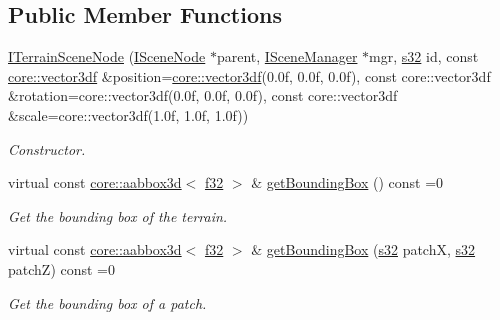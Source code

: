 \subsection*{Public Member Functions}
\begin{DoxyCompactItemize}
\item 
\mbox{\label{classirr_1_1scene_1_1ITerrainSceneNode_a152a472837bbce22d1221086a47d8af5}} 
\hyperlink{classirr_1_1scene_1_1ITerrainSceneNode_a152a472837bbce22d1221086a47d8af5}{I\+Terrain\+Scene\+Node} (\hyperlink{classirr_1_1scene_1_1ISceneNode}{I\+Scene\+Node} $\ast$parent, \hyperlink{classirr_1_1scene_1_1ISceneManager}{I\+Scene\+Manager} $\ast$mgr, \hyperlink{namespaceirr_ac66849b7a6ed16e30ebede579f9b47c6}{s32} id, const \hyperlink{namespaceirr_1_1core_ae6e2b2a6c552833ebbd5b7463d03586b}{core\+::vector3df} \&position=\hyperlink{namespaceirr_1_1core_ae6e2b2a6c552833ebbd5b7463d03586b}{core\+::vector3df}(0.\+0f, 0.\+0f, 0.\+0f), const core\+::vector3df \&rotation=core\+::vector3df(0.\+0f, 0.\+0f, 0.\+0f), const core\+::vector3df \&scale=core\+::vector3df(1.\+0f, 1.\+0f, 1.\+0f))
\begin{DoxyCompactList}\small\item\em Constructor. \end{DoxyCompactList}\item 
virtual const \hyperlink{classirr_1_1core_1_1aabbox3d}{core\+::aabbox3d}$<$ \hyperlink{namespaceirr_a0277be98d67dc26ff93b1a6a1d086b07}{f32} $>$ \& \hyperlink{classirr_1_1scene_1_1ITerrainSceneNode_a02a14fe28f5a326fca819c36bee2e92e}{get\+Bounding\+Box} () const =0
\begin{DoxyCompactList}\small\item\em Get the bounding box of the terrain. \end{DoxyCompactList}\item 
virtual const \hyperlink{classirr_1_1core_1_1aabbox3d}{core\+::aabbox3d}$<$ \hyperlink{namespaceirr_a0277be98d67dc26ff93b1a6a1d086b07}{f32} $>$ \& \hyperlink{classirr_1_1scene_1_1ITerrainSceneNode_a383501cc9c5cd30176f1f7ff6f8ab817}{get\+Bounding\+Box} (\hyperlink{namespaceirr_ac66849b7a6ed16e30ebede579f9b47c6}{s32} patchX, \hyperlink{namespaceirr_ac66849b7a6ed16e30ebede579f9b47c6}{s32} patchZ) const =0
\begin{DoxyCompactList}\small\item\em Get the bounding box of a patch. \end{DoxyCompactList}\item 

\end{DoxyCompactItemize}
